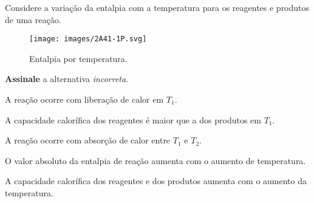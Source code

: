 \documentclass[braun, twocolumn]{braun}
\begin{document}
\begin{problem}
[2A41]Considere a variação da entalpia com a temperatura para os reagentes e
produtos de uma reação.

\begin{figure}
\centering
\texttt{[image: images/2A41-1P.svg]}
\caption{Entalpia por temperatura.}
\end{figure}

\textbf{Assinale} a alternativa \emph{incorreta}.


\begin{choices}

\item A reação ocorre com liberação de calor em \(T_1\).

\item A capacidade calorífica dos reagentes é maior que a dos produtos em
\(T_1\).

\item A reação ocorre com absorção de calor entre \(T_1\) e \(T_2\).

\item O valor absoluto da entalpia de reação aumenta com o aumento de
temperatura.

\item A capacidade calorífica dos reagentes e dos produtos aumenta com o
aumento da temperatura.

\end{choices}

\end{problem}
\end{document}
